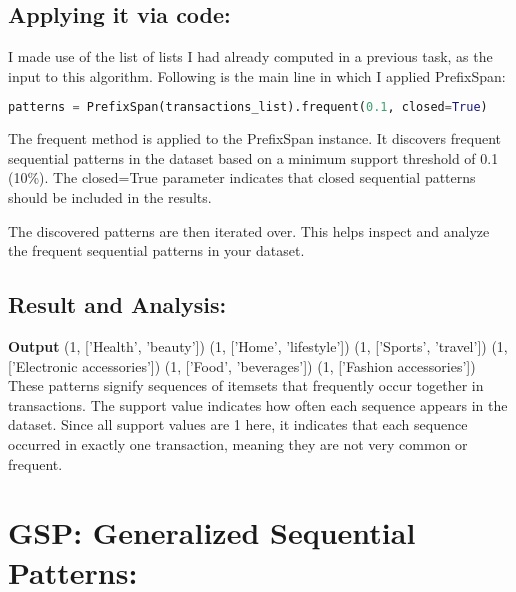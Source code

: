 \subsection{Applying it via code:} 
I made use of the list of lists I had already computed in a previous task, as the input to this algorithm. Following is the main line in which I applied PrefixSpan:
\begin{lstlisting}[language=Python, frame=none]
patterns = PrefixSpan(transactions_list).frequent(0.1, closed=True)
\end{lstlisting}
The frequent method is applied to the PrefixSpan instance. It discovers frequent sequential patterns in the dataset based on a minimum support threshold of 0.1 (10\%). The closed=True parameter indicates that closed sequential patterns should be included in the results.

The discovered patterns are then iterated over. This helps inspect and analyze the frequent sequential patterns in your dataset.

\subsection{Result and Analysis:}
\newline
\newline 
\textbf{Output}
(1, ['Health', 'beauty'])
\newline 
(1, ['Home', 'lifestyle'])
\newline 
(1, ['Sports', 'travel'])
\newline 
(1, ['Electronic accessories'])
\newline 
(1, ['Food', 'beverages'])
\newline
(1, ['Fashion accessories'])
\newline 
\newline 
These patterns signify sequences of itemsets that frequently occur together in transactions. The support value indicates how often each sequence appears in the dataset. Since all support values are 1 here, it indicates that each sequence occurred in exactly one transaction, meaning they are not very common or frequent.


\section{GSP: Generalized Sequential Patterns:}


